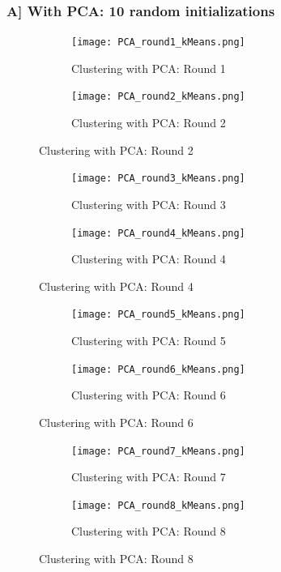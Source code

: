 \documentclass[a4paper,11pt]{article}
\begin{document}
\begin{mlsolution}
\subsubsection{A] With PCA: 10 random initializations}

\begin{figure}[!htbp]
	\begin{subfigure}{.5\textwidth}
		\centering
		\texttt{[image: PCA\_round1\_kMeans.png]}
		\caption{Clustering with PCA: Round 1}
		\label{pca1}
	\end{subfigure}%
	\begin{subfigure}{.5\textwidth}
		\centering
		\texttt{[image: PCA\_round2\_kMeans.png]}
		\caption{Clustering with PCA: Round 2}
		\label{pca2}
	\end{subfigure}
\end{figure}

\begin{figure}[!htbp]
	\begin{subfigure}{.5\textwidth}
		\centering
		\texttt{[image: PCA\_round3\_kMeans.png]}
		\caption{Clustering with PCA: Round 3}
		\label{pca3}
	\end{subfigure}%
	\begin{subfigure}{.5\textwidth}
		\centering
		\texttt{[image: PCA\_round4\_kMeans.png]}
		\caption{Clustering with PCA: Round 4}
		\label{pca4}
	\end{subfigure}
\end{figure}

\begin{figure}[!htbp]
	\begin{subfigure}{.5\textwidth}
		\centering
		\texttt{[image: PCA\_round5\_kMeans.png]}
		\caption{Clustering with PCA: Round 5}
		\label{pca5}
	\end{subfigure}%
	\begin{subfigure}{.5\textwidth}
		\centering
		\texttt{[image: PCA\_round6\_kMeans.png]}
		\caption{Clustering with PCA: Round 6}
		\label{pca6}
	\end{subfigure}
\end{figure}

\begin{figure}[!htbp]
	\begin{subfigure}{.5\textwidth}
		\centering
		\texttt{[image: PCA\_round7\_kMeans.png]}
		\caption{Clustering with PCA: Round 7}
		\label{pca7}
	\end{subfigure}%
	\begin{subfigure}{.5\textwidth}
		\centering
		\texttt{[image: PCA\_round8\_kMeans.png]}
		\caption{Clustering with PCA: Round 8}
		\label{pca8}
	\end{subfigure}
\end{figure}


\end{mlsolution}
\end{document}
